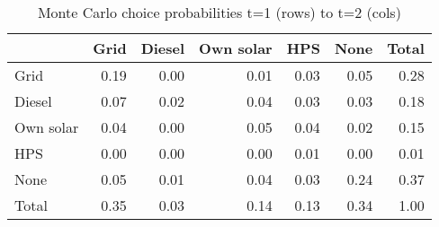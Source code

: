 \begin{table}[!ht]
	\centering
		\caption{Monte Carlo choice probabilities t=1 (rows) to t=2 (cols)}
\begin{tabular}{lrrrrrr}
		\toprule
               &      Grid&    Diesel& Own solar&       HPS&      None&     Total\\
		\midrule
		           Grid&      0.19&      0.00&      0.01&      0.03&      0.05&      0.28\\
		         Diesel&      0.07&      0.02&      0.04&      0.03&      0.03&      0.18\\
		      Own solar&      0.04&      0.00&      0.05&      0.04&      0.02&      0.15\\
		            HPS&      0.00&      0.00&      0.00&      0.01&      0.00&      0.01\\
		           None&      0.05&      0.01&      0.04&      0.03&      0.24&      0.37\\
		          Total&      0.35&      0.03&      0.14&      0.13&      0.34&      1.00\\
		\bottomrule
	\end{tabular}
\end{table}
